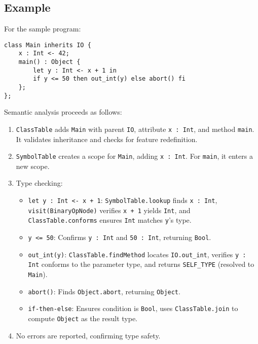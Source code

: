 \documentclass[11pt, titlepage]{article}
\begin{document}
\subsection{Example}
For the sample program:
\begin{lstlisting}
class Main inherits IO {
    x : Int <- 42;
    main() : Object {
        let y : Int <- x + 1 in
        if y <= 50 then out_int(y) else abort() fi
    };
};
\end{lstlisting}

Semantic analysis proceeds as follows:
\begin{enumerate}[leftmargin=*]
    \item \texttt{ClassTable} adds \texttt{Main} with parent \texttt{IO}, attribute \texttt{x : Int}, and method \texttt{main}. It validates inheritance and checks for feature redefinition.
    \item \texttt{SymbolTable} creates a scope for \texttt{Main}, adding \texttt{x : Int}. For \texttt{main}, it enters a new scope.
    \item Type checking:
        \begin{itemize}
            \item \texttt{let y : Int <- x + 1}: \texttt{SymbolTable.lookup} finds \texttt{x : Int}, \texttt{visit(BinaryOpNode)} verifies \texttt{x + 1} yields \texttt{Int}, and \texttt{ClassTable.conforms} ensures \texttt{Int} matches \texttt{y}'s type.
            \item \texttt{y <= 50}: Confirms \texttt{y : Int} and \texttt{50 : Int}, returning \texttt{Bool}.
            \item \texttt{out\_int(y)}: \texttt{ClassTable.findMethod} locates \texttt{IO.out\_int}, verifies \texttt{y : Int} conforms to the parameter type, and returns \texttt{SELF\_TYPE} (resolved to \texttt{Main}).
            \item \texttt{abort()}: Finds \texttt{Object.abort}, returning \texttt{Object}.
            \item \texttt{if-then-else}: Ensures condition is \texttt{Bool}, uses \texttt{ClassTable.join} to compute \texttt{Object} as the result type.
        \end{itemize}
    \item No errors are reported, confirming type safety.
\end{enumerate}
\end{document}
